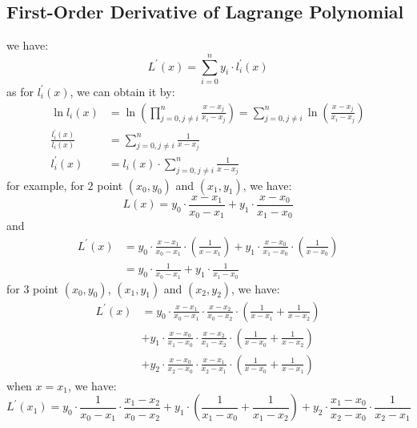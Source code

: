 \documentclass[12pt, onecolumn]{article}
\begin{document}
	\subsection{First-Order Derivative of Lagrange Polynomial}
	we have:
	\begin{equation}
	L^\prime (x)=\sum_{i=0}^{n}y_i\cdot l_i^\prime(x)
	\end{equation}
	as for $l_i^\prime(x)$, we can obtain it by:
	\begin{equation}
	\begin{aligned}
	\ln l_i(x)&=\ln\left( \prod_{j=0,j\ne i}^{n}\frac{x-x_j}{x_i-x_j}\right) =\sum_{j=0,j\ne i}^{n}\ln\left( \frac{x-x_j}{x_i-x_j}\right) 
	\\
	\frac{l_i^\prime(x)}{l_i(x)}&=\sum_{j=0,j\ne i}^{n}\frac{1}{x-x_j}
	\\
	l_i^\prime(x)&=l_i(x)\cdot \sum_{j=0,j\ne i}^{n}\frac{1}{x-x_j}
	\end{aligned}
	\end{equation}
	for example, for $2$ point $(x_0,y_0)$ and $(x_1,y_1)$, we have:
	\begin{equation}
	L(x)=y_0\cdot\frac{x-x_1}{x_0-x_1}+y_1\cdot\frac{x-x_0}{x_1-x_0}
	\end{equation}
	and 
	\begin{equation}
	\begin{aligned}
	L^\prime(x)&=y_0\cdot\frac{x-x_1}{x_0-x_1}\cdot\left(
		\frac{1}{x-x_1}
		\right) +y_1\cdot\frac{x-x_0}{x_1-x_0}\cdot\left(
			\frac{1}{x-x_0}
			\right)
			\\
			&=y_0\cdot\frac{1}{x_0-x_1}+y_1\cdot\frac{1}{x_1-x_0}
	\end{aligned}
	\end{equation}
	for $3$ point $(x_0,y_0)$, $(x_1,y_1)$ and $(x_2,y_2)$, we have:
	\begin{equation}
	\begin{aligned}
	L^\prime(x)&=y_0\cdot\frac{x-x_1}{x_0-x_1}\cdot\frac{x-x_2}{x_0-x_2}\cdot\left(\frac{1}{x-x_1}+\frac{1}{x-x_2}\right) \\
		&+y_1\cdot\frac{x-x_0}{x_1-x_0}\cdot\frac{x-x_2}{x_1-x_2}\cdot\left(\frac{1}{x-x_0}+\frac{1}{x-x_2}\right) \\
		&+y_2\cdot\frac{x-x_0}{x_2-x_0}\cdot\frac{x-x_1}{x_2-x_1}\cdot\left(\frac{1}{x-x_0}+\frac{1}{x-x_1}\right)
	\end{aligned}
	\end{equation}
	when $x=x_1$, we have:
	\begin{equation}
	L^\prime(x_1)=y_0\cdot\frac{1}{x_0-x_1}\cdot\frac{x_1-x_2}{x_0-x_2}
	+y_1\cdot\left(\frac{1}{x_1-x_0}+\frac{1}{x_1-x_2}\right)
	+y_2\cdot\frac{x_1-x_0}{x_2-x_0}\cdot\frac{1}{x_2-x_1}
	\end{equation}
\end{document}
